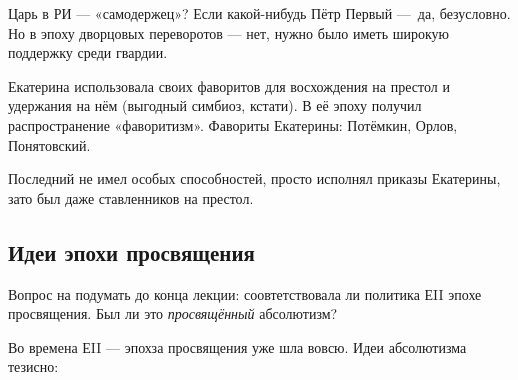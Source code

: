 \documentclass[12pt, a4paper]{article}
\begin{document}
Царь в РИ — «самодержец»? Если какой-нибудь Пётр Первый — да, безусловно. 
Но в эпоху дворцовых переворотов — нет, нужно было иметь широкую поддержку среди гвардии.

Екатерина использовала своих фаворитов для восхождения на престол и удержания на нём (выгодный симбиоз, кстати). 
В её эпоху получил распространение «фаворитизм». Фавориты Екатерины: Потёмкин, Орлов, Понятовский.

Последний не имел особых способностей, просто исполнял приказы Екатерины, зато был даже ставленников на престол.



\subsection{Идеи эпохи просвящения}

Вопрос на подумать до конца лекции: соовтетствовала ли политика ЕII эпохе просвящения. Был ли это \textit{просвящённый} абсолютизм?

Во времена ЕII — эпохза просвящения уже шла вовсю.
Идеи абсолютизма тезисно:
\end{document}
